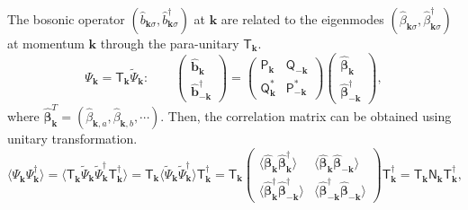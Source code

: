 \documentclass[aps, prx, nofootinbib, superscriptaddress]{revtex4-2}
\newcommand{\kvec}{\mathbf{k}}
\begin{document}
The bosonic operator $(\hat{b}_{\kvec\sigma}^{\phantom \dagger}, \hat{b}_{\kvec\sigma}^{\dagger} )$ at $\kvec$ are related to the eigenmodes $(\hat{\beta}_{\kvec\sigma}^{\phantom \dagger}, \hat{\beta}_{\kvec\sigma}^{\dagger} )$ at momentum $\kvec$ through the para-unitary $\mathsf{T}_{\kvec}$. 
\begin{equation}
    \Psi_{\kvec} = \mathsf{T}_{\kvec} \widetilde{\Psi}_{\kvec}: \qquad
    \begin{pmatrix}
        \hat{\bm b}_{\kvec} \\ 
        \hat{\bm b}^{\dagger}_{-\kvec}
    \end{pmatrix}
    = 
    \begin{pmatrix}
        \mathsf{P}_{\kvec}           & \mathsf{Q}_{-\kvec}        \\
        \mathsf{Q}_{\kvec}^{*}       & \mathsf{P}_{-\kvec}^{*}
    \end{pmatrix}
    \begin{pmatrix}
        \hat{\bm\beta}_{\kvec} \\
        \hat{\bm\beta}_{-\kvec}^{\dagger}
    \end{pmatrix},
\end{equation}
where $\hat{\bm\beta}_{\kvec}^{T} = (\hat{\beta}_{\kvec,a}, \hat{\beta}_{\kvec,b}, \cdots)$.
Then, the correlation matrix can be obtained using unitary transformation.
\begin{equation}
    \big 
    \langle \Psi_{\kvec}^{\phantom \dagger} \Psi_{\kvec}^{\dagger} 
    \big \rangle 
    = 
    \big\langle 
    \mathsf{T}_{\kvec}^{\phantom\dagger} \widetilde{\Psi}_{\kvec}^{\phantom\dagger} \widetilde{\Psi}_{\kvec}^{\dagger} \mathsf{T}_{\kvec}^{\dagger} 
    \big\rangle
    = 
    \mathsf{T}_{\kvec} \big\langle \widetilde{\Psi}_{\kvec}^{\phantom\dagger} \widetilde{\Psi}_{\kvec}^{\dagger}  \big \rangle \mathsf{T}_{\kvec}^{\dagger}
    = 
    \mathsf{T}_{\kvec} 
    \begin{pmatrix}
            \langle \hat{\bm \beta}_{ \kvec}^{\phantom \dagger} \hat{\bm \beta}_{ \kvec}^{\dagger}          \rangle            
        &   \langle \hat{\bm \beta}_{ \kvec}^{\phantom \dagger} \hat{\bm \beta}_{-\kvec}^{\phantom \dagger} \rangle\\
            \langle \hat{\bm \beta}_{ \kvec}^{\dagger}          \hat{\bm \beta}_{-\kvec}^{\dagger}          \rangle  
        &   \langle \hat{\bm \beta}_{-\kvec}^{\dagger}          \hat{\bm \beta}_{-\kvec}^{\phantom \dagger} \rangle
    \end{pmatrix}
    \mathsf{T}_{\kvec}^{\dagger}
    =\mathsf{T}_{\kvec}^{\phantom \dagger} \mathsf{N}_{\kvec}^{\phantom \dagger} \mathsf{T}_{\kvec}^{\dagger},
\end{equation}
\end{document}
